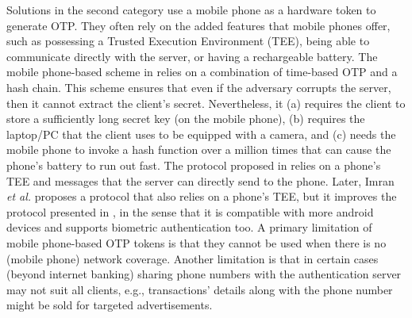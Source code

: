 %

Solutions in the second category use a mobile phone as a hardware token to generate OTP. They often rely on the added features that mobile phones offer, such as possessing a Trusted Execution Environment (TEE), being able to communicate directly with the server, or having a rechargeable battery. The mobile phone-based scheme in  \cite{KoganMB17} relies on a combination of time-based OTP and a hash chain. This scheme ensures that even if the adversary corrupts the server, then it cannot extract the client's secret. Nevertheless, it  (a) requires the client to store a sufficiently long secret key (on the mobile phone), (b) requires the laptop/PC that the client uses to be equipped with a camera, and (c) needs the mobile phone to invoke a hash function over a million times that can cause the phone's battery to run out fast. The protocol proposed in \cite{KonothFFARB20} relies on a phone's TEE  and messages that the server can directly send to the phone. Later,  Imran \textit{et al.} \cite{SARA22} proposes a protocol that also relies on a phone's TEE, but it improves the protocol presented in \cite{KonothFFARB20}, in the sense that it is compatible with more android devices and supports biometric authentication too.  A primary limitation of mobile phone-based OTP tokens is that they cannot be used when there is no (mobile phone) network coverage. Another limitation is that in certain cases (beyond internet banking) sharing phone numbers with the authentication server may not suit all clients, e.g., transactions' details along with the phone number might be sold for targeted advertisements. 
%





%







